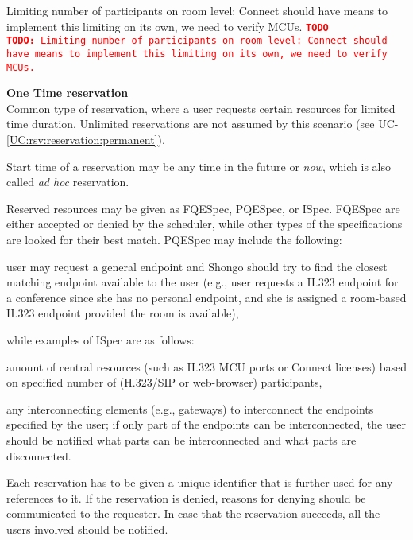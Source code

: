 \documentclass[a4paper]{report}
\makeatletter
\newcounter{UCcounter}
\newenvironment{UseCases}%
	{\begin{list}{\textbf{UC-\arabic{UCcounter}}}{\@nmbrlisttrue\def\@listctr{UCcounter}}}%
	{\end{list}}
\newcommand{\UClabel}[1]{\label{UC:#1}}
\newcommand{\UCref}[1]{UC-\ref{UC:#1}}
\newcommand{\UseCase}[2]{\item\UClabel{#2} \textbf{#1}\\}
\newcommand{\TODO}[1]{%
\def\empty{}%
\def\prvniparametr{#1}%
\ifx\prvniparametr\empty%
\begingroup\tt\textcolor{red}{\noindent\textbf{TODO}}\endgroup
\else%
\begingroup\tt\textcolor{red}{\noindent\textbf{TODO:}\ #1}\endgroup
\fi%
}
\makeatother
\begin{document}
\begin{UseCases}
\TODO{Limiting number of participants on room level: Connect should have means
to implement this limiting on its own, we need to verify MCUs.}


\UseCase{One Time reservation}{rsv:reservation:one}

Common type of reservation, where a user requests certain resources for limited
time duration. Unlimited reservations are not assumed by this scenario (see
\UCref{rsv:reservation:permanent}).

Start time of a reservation may be any time in the future or \emph{now}, which
is also called \emph{ad hoc} reservation.

Reserved resources may be given as FQESpec, PQESpec, or ISpec. FQESpec are
either accepted or denied by the scheduler, while other types of the
specifications are looked for their best match. PQESpec may include the
following:

\begin{compactitem}

\item user may request a general endpoint and Shongo should try to find the
closest matching endpoint available to the user (e.g., user requests a H.323
endpoint for a conference since she has no personal endpoint, and she is
assigned a room-based H.323 endpoint provided the room is available),

\end{compactitem}

while examples of ISpec are as follows:

\begin{compactitem}

\item amount of central resources (such as H.323 MCU ports or Connect licenses)
based on specified number of (H.323/SIP or web-browser) participants,

\item any interconnecting elements (e.g., gateways) to interconnect the
endpoints specified by the user; if only part of the endpoints can be
interconnected, the user should be notified what parts can be interconnected
and what parts are disconnected.

\end{compactitem}

Each reservation has to be given a unique identifier that is further used for
any references to it. If the reservation is denied, reasons for denying should
be communicated to the requester. In case that the reservation succeeds, all
the users involved should be notified.



\end{UseCases}
\end{document}
